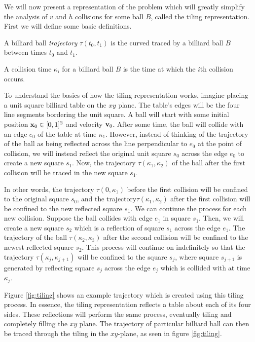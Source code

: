 We will now present a representation of the problem which will greatly simplify the analysis of $v$ and $h$ collisions for some ball $B$, called the tiling representation. First we will define some basic definitions.

\begin{definition}
  A billiard ball \emph{trajectory} $\tau(t_0, t_1)$ is the curved traced by a billiard ball $B$ between times $t_0$ and $t_1$.
\end{definition}

\begin{definition}
  A collision time $\kappa_i$ for a billiard ball $B$ is the time at which the $i$th collision occurs.
\end{definition}

To understand the basics of how the tiling representation works, imagine placing a unit square billiard table on the $xy$ plane. The table's edges will be the four line segments bordering the unit square. A ball will start with some initial position $\mathbf{x}_0 \in [0,1]^2$ and velocity $\mathbf{v}_0$. After some time, the ball will collide with an edge $e_0$ of the table at time $\kappa_1$. However, instead of thinking of the trajectory of the ball as being reflected across the line perpendicular to $e_0$ at the point of collision, we will instead reflect the original unit square $s_0$ across the edge $e_0$ to create a new square $s_1$. Now, the trajectory $\tau(\kappa_1, \kappa_2)$ of the ball after the first collision will be traced in the new square $s_1$.

In other words, the trajectory $\tau(0, \kappa_1)$ before the first collision will be confined to the original square $s_0$, and the trajectory$\tau(\kappa_1, \kappa_2)$ after the first collision will be confined to the new reflected square $s_1$. We can continue the process for each new collision. Suppose the ball collides with edge $e_1$ in square $s_1$. Then, we will create a new square $s_2$ which is a reflection of square $s_1$ across the edge $e_1$. The trajectory of the ball $\tau(\kappa_2, \kappa_3)$ after the second collision will be confined to the newest reflected square $s_2$. This process will continue on indefinitely so that the trajectory $\tau(\kappa_j, \kappa_{j+1})$ will be confined to the square $s_j$, where square $s_{j+1}$ is generated by reflecting square $s_{j}$ across the edge $e_{j}$ which is collided with at time $\kappa_j$.

Figure \ref{fig:tiling} shows an example trajectory which is created using this tiling process. In essence, the tiling representation reflects a table about each of its four sides. These reflections will perform the same process, eventually tiling and completely filling the $xy$ plane. The trajectory of particular billiard ball can then be traced through the tiling in the $xy$-plane, as seen in figure \ref{fig:tiling}.

